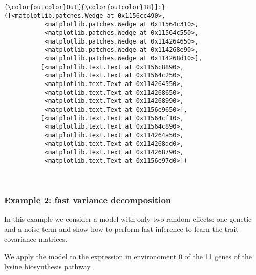 \documentclass{article}
\begin{document}
            \begin{Verbatim}[commandchars=\\\{\}]
{\color{outcolor}Out[{\color{outcolor}18}]:} ([<matplotlib.patches.Wedge at 0x1156cc490>,
           <matplotlib.patches.Wedge at 0x11564c310>,
           <matplotlib.patches.Wedge at 0x11564c550>,
           <matplotlib.patches.Wedge at 0x114264650>,
           <matplotlib.patches.Wedge at 0x114268e90>,
           <matplotlib.patches.Wedge at 0x114268d10>],
          [<matplotlib.text.Text at 0x1156c8890>,
           <matplotlib.text.Text at 0x11564c250>,
           <matplotlib.text.Text at 0x114264550>,
           <matplotlib.text.Text at 0x114268650>,
           <matplotlib.text.Text at 0x114268990>,
           <matplotlib.text.Text at 0x1156e9650>],
          [<matplotlib.text.Text at 0x11564cf10>,
           <matplotlib.text.Text at 0x11564c890>,
           <matplotlib.text.Text at 0x114264a50>,
           <matplotlib.text.Text at 0x114268dd0>,
           <matplotlib.text.Text at 0x114268790>,
           <matplotlib.text.Text at 0x1156e97d0>])
\end{Verbatim}
        
    \begin{center}
    \end{center}
    { \hspace*{\fill} \\}
    

    \subsubsection{Example 2: fast variance decomposition}


    In this example we consider a model with only two random effects: one
genetic and a noise term and show how to perform fast inference to learn
the trait covariance matrices.

We apply the model to the expression in environoment 0 of the 11 genes
of the lysine biosynthesis pathway.
\end{document}
